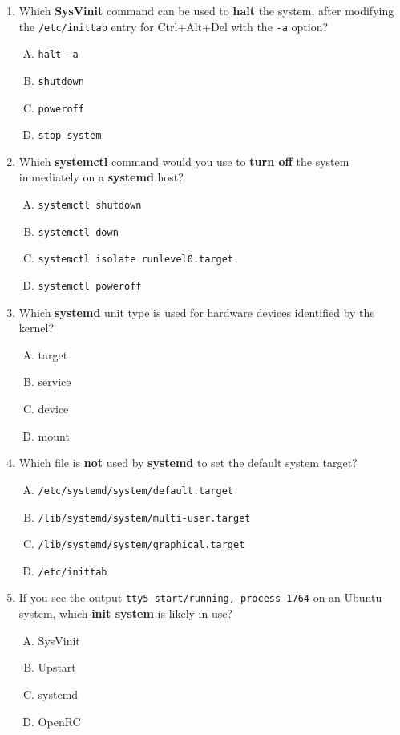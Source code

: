 \documentclass[12pt,a4paper]{report}
\begin{document}
\begin{enumerate}[1.]
    \item Which \textbf{SysVinit} command can be used to \textbf{halt} the system, after modifying the \texttt{/etc/inittab} entry for Ctrl+Alt+Del with the \texttt{-a} option?
    \begin{enumerate}[A)]
        \item \texttt{halt -a}
        \item \texttt{shutdown}
        \item \texttt{poweroff}
        \item \texttt{stop system}
    \end{enumerate}
    
    \item Which \textbf{systemctl} command would you use to \textbf{turn off} the system immediately on a \textbf{systemd} host?
    \begin{enumerate}[A)]
        \item \texttt{systemctl shutdown}
        \item \texttt{systemctl down}
        \item \texttt{systemctl isolate runlevel0.target}
        \item \texttt{systemctl poweroff}
    \end{enumerate}
    
    \item Which \textbf{systemd} unit type is used for hardware devices identified by the kernel?
    \begin{enumerate}[A)]
        \item target
        \item service
        \item device
        \item mount
    \end{enumerate}
    
    \item Which file is \textbf{not} used by \textbf{systemd} to set the default system target?
    \begin{enumerate}[A)]
        \item \texttt{/etc/systemd/system/default.target}
        \item \texttt{/lib/systemd/system/multi-user.target}
        \item \texttt{/lib/systemd/system/graphical.target}
        \item \texttt{/etc/inittab}
    \end{enumerate}
    
    \item If you see the output \texttt{tty5 start/running, process 1764} on an Ubuntu system, which \textbf{init system} is likely in use?
    \begin{enumerate}[A)]
        \item SysVinit
        \item Upstart
        \item systemd
        \item OpenRC
    \end{enumerate}
    

\end{enumerate}
\end{document}
